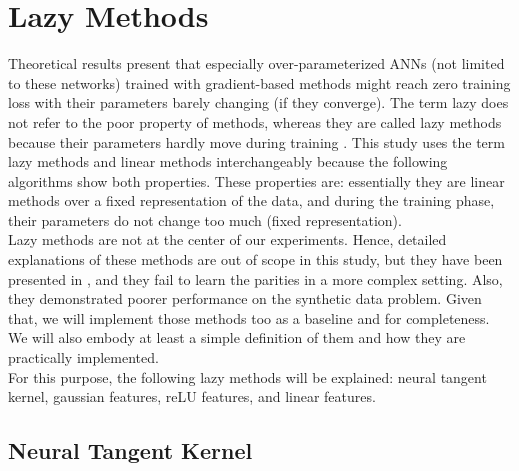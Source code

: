 \documentclass[a4paper, nobind]{templates/ociamthesis}
\begin{document}
\hypertarget{lazy-methods}{%
\section{Lazy Methods}\label{lazy-methods}}

Theoretical results present that especially over-parameterized ANNs (not limited to these networks) trained with gradient-based methods might reach zero training loss with their parameters barely changing (if they converge). The term lazy does not refer to the poor property of methods, whereas they are called lazy methods because their parameters hardly move during training \cite{chizat2020lazy}. This study uses the term lazy methods and linear methods interchangeably because the following algorithms show both properties. These properties are: essentially they are linear methods over a fixed representation of the data, and during the training phase, their parameters do not change too much (fixed representation).\\
Lazy methods are not at the center of our experiments. Hence, detailed explanations of these methods are out of scope in this study, but they have been presented in \cite{DBLP:journals/corr/abs-2002-07400, chizat2020implicit}, and they fail to learn the parities in a more complex setting. Also, they demonstrated poorer performance on the synthetic data problem. Given that, we will implement those methods too as a baseline and for completeness. We will also embody at least a simple definition of them and how they are practically implemented.\\
For this purpose, the following lazy methods will be explained: neural tangent kernel, gaussian features, reLU features, and linear features.

\hypertarget{neural-tangent-kernel}{%
\subsection{Neural Tangent Kernel}\label{neural-tangent-kernel}}
\end{document}
